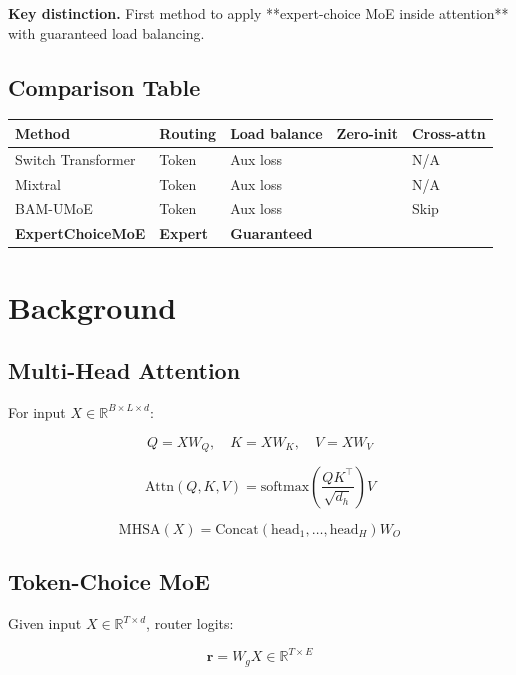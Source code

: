 \textbf{Key distinction.} First method to apply **expert-choice MoE inside 
attention** with guaranteed load balancing.



\subsection{Comparison Table}

\begin{table}[H]
\centering
\small
\begin{tabular}{lllll}
\toprule
\textbf{Method} & \textbf{Routing} & \textbf{Load balance} & \textbf{Zero-init} & \textbf{Cross-attn} \\
\midrule
Switch Transformer & Token & Aux loss &  & N/A \\
Mixtral & Token & Aux loss &  & N/A \\
BAM-UMoE & Token & Aux loss &  & Skip \\
\textbf{ExpertChoiceMoE} & \textbf{Expert} & \textbf{Guaranteed} &  &  \\
\bottomrule
\end{tabular}
\end{table}



\section{Background}

\subsection{Multi-Head Attention}

For input $X \in \mathbb{R}^{B \times L \times d}$:

\[
Q = X W_Q, \quad K = X W_K, \quad V = X W_V
\tag{3.1}
\]

\[
\text{Attn}(Q, K, V) = \text{softmax}\!\left(\frac{Q K^\top}{\sqrt{d_h}}\right) V
\tag{3.2}
\]

\[
\text{MHSA}(X) = \text{Concat}(\text{head}_1, \dots, \text{head}_H) W_O
\tag{3.3}
\]

\subsection{Token-Choice MoE}

Given input $X \in \mathbb{R}^{T \times d}$, router logits:

\[
\mathbf{r} = W_g X \in \mathbb{R}^{T \times E}
\tag{3.4}
\]

